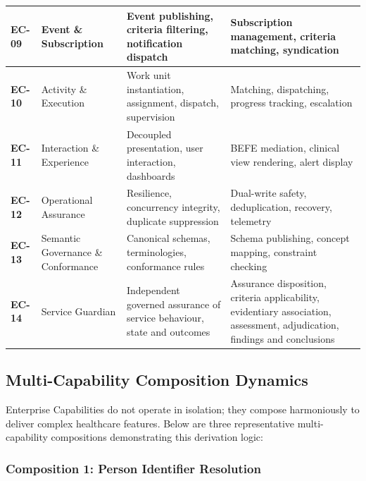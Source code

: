 \begin{longtable}{|>{\raggedright\arraybackslash}p{0.25\TableWidth}|>{\raggedright\arraybackslash}p{0.25\TableWidth}|>{\raggedright\arraybackslash}p{0.25\TableWidth}|>{\raggedright\arraybackslash}p{0.25\TableWidth}|}
\textbf{EC-09} & Event \& Subscription & Event publishing, criteria filtering, notification dispatch & Subscription management, criteria matching, syndication\\\hline
\textbf{EC-10} & Activity \& Execution & Work unit instantiation, assignment, dispatch, supervision & Matching, dispatching, progress tracking, escalation\\\hline
\textbf{EC-11} & Interaction \& Experience & Decoupled presentation, user interaction, dashboards & BEFE mediation, clinical view rendering, alert display\\\hline
\textbf{EC-12} & Operational Assurance & Resilience, concurrency integrity, duplicate suppression & Dual-write safety, deduplication, recovery, telemetry\\\hline
\textbf{EC-13} & Semantic Governance \& Conformance & Canonical schemas, terminologies, conformance rules & Schema publishing, concept mapping, constraint checking\\\hline
\textbf{EC-14} & Service Guardian & Independent governed assurance of service behaviour, state and outcomes & Assurance disposition, criteria applicability, evidentiary association, assessment, adjudication, findings and conclusions\\\hline
\end{longtable}\endgroup
{}\label{rad:enterprise:275}

\par\smallskip
{}\label{rad:enterprise:277}
\subsection*{Multi-Capability Composition Dynamics}
\label{rad:enterprise:279}

Enterprise Capabilities do not operate in isolation; they compose harmoniously to deliver complex healthcare features. Below are three representative multi-capability compositions demonstrating this derivation logic:

\label{rad:enterprise:281}
\subsubsection*{Composition 1: Person Identifier Resolution}
\label{rad:enterprise:282}

